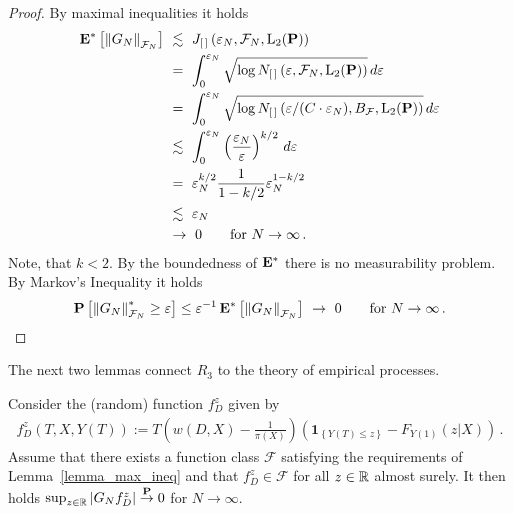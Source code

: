 \begin{proof}
  By maximal inequalities it holds
  \begin{align*}
    \E^*
    \left[ 
      \norm{G_N}_{\mathcal{F}_N}
    \right]
    &
      \ 
      \lesssim
      \ 
      J_{[\,]}\left( \varepsilon_N, \mathcal{F}_N,\mathrm{L}_2(\P) \right)
      \\
    &
      \ 
      =
      \ 
      \int_0^{\varepsilon_N}
      \sqrt{
        \log 
      N_{[\,]}
\left( \varepsilon, \mathcal{F}_N,\mathrm{L}_2(\P) \right)
    }
    \,
    d\varepsilon
    \\
    &
    \ 
    =
    \ 
      \int_0^{\varepsilon_N}
      \sqrt{\log 
      N_{[\,]}
\left( \varepsilon/(C\cdot \varepsilon_N), B_\mathcal{F},\mathrm{L}_2(\P) \right)
    }
    \,
    d\varepsilon
    \\
    &
    \ 
    \lesssim
    \ 
      \int_0^{\varepsilon_N}
      \left( 
      \frac{\varepsilon_N}{\varepsilon}
    \right)^{k/2}
    \,
    d\varepsilon
    \\
    &
    \ 
    =
    \ 
  \varepsilon_N^{k/2}
  \frac{1}{1-k/2}
  \varepsilon_N^{1-k/2}
  \\
    &
    \ 
  \lesssim
    \ 
  \varepsilon_N
  \\
    &
    \ 
  \to
  \ 
  0
  \qquad
  \text{for}\ 
  N\to
  \infty
  \,.
  \end{align*}
  Note, that $k<2$.
  By the boundedness of $\mathbf{E}^*$ there is no measurability problem.
  By Markov's Inequality it holds
  \begin{align*}
    \P
    \left[ 
      \norm{G_N}^*_{\mathcal{F}_N}\ge \varepsilon
    \right]
    \le
    \varepsilon^{-1}
    \,
    \E^*
    \left[ 
      \norm{G_N}_{\mathcal{F}_N}
    \right]
    \ 
    \to
    \ 
    0
    \qquad
    \text{for}\ 
    N\to\infty
    \,.
  \end{align*}
\end{proof}
The next two lemmas connect $R_3$ to the theory of empirical processes.
\begin{lemma}
  \label{aa:mean:l:fz}
  Consider 
  the (random) function
  $
  f_D^z
  $ given by
  \begin{gather}
    f_{D}^z(T,X,Y(T))
    :=
    T
    \left( 
    w(D,X)- \frac{1}{\pi(X)}
    \right)
    \left( 
    \mathbf{1}_{\left\{ Y(T) \le z \right\}}
    -
  F_{Y(1)}(z|X)
    \right)
    \,.
  \end{gather}
  Assume that 
  there exists a function class $\mathcal{F}$ satisfying the requirements of Lemma~\ref{lemma_max_ineq} and that
  $
  f_D^z
  \in \mathcal{F}
  $
  for all $z\in\mathbb{R}$ almost surely.
  It then holds
  $
  \sup_{z\in\mathbb{R}} \left| G_Nf_D^z \right|
  \overset{\mathbf{P}}{\to}0$ for 
  $N\to\infty$.
\end{lemma}
